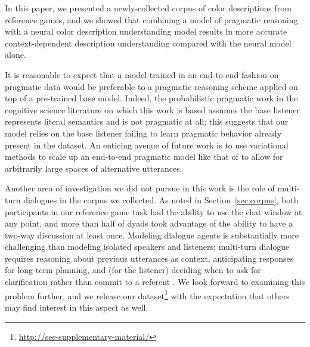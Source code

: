 \documentclass[11pt,letterpaper]{article}
\renewcommand{\|}{\mid}
\newcommand{\secref}[1]{Section~\ref{#1}}
\begin{document}
In this paper, we presented a newly-collected corpus of color descriptions from
reference games, and we showed that combining a model of pragmatic reasoning
with a neural color description understanding model results in more accurate
context-dependent description understanding compared with the neural model alone.

It is reasonable to expect that a model trained in an end-to-end fashion on
pragmatic data would be preferable to a pragmatic reasoning scheme applied on
top of a pre-trained base model.
Indeed, the probabilistic pragmatic work in the cognitive science literature
on which this work is based assumes the base listener represents literal semantics
and is not pragmatic at all; this suggests that our model relies on the base
listener failing to learn pragmatic behavior already present in the dataset.
An enticing avenue of future work is to use variational methods to scale
up an end-to-end pragmatic model like that of  to
allow for arbitrarily large spaces of alternative utterances.

Another area of investigation we did not pursue in this work is the role of
multi-turn dialogues in the corpus we collected. As noted in \secref{sec:corpus},
both participants in our reference game task had the ability to use the chat window
at any point, and more than half of dyads took advantage of the ability
to have a two-way discussion at least once. Modeling dialogue agents is substantially
more challenging than modeling isolated speakers and listeners; multi-turn dialogue
requires reasoning about previous utterances as context, anticipating
responses for long-term planning, and (for the listener) deciding when
to ask for clarification rather than commit to a referent
\cite{Lewis79_Scorekeeping,BrownYule83_Discourse,Clark96,Roberts96_InformationStructureDiscourse}.
We look forward to examining this problem further, and we release our
dataset\footnote{\label{foot:release}\url{http://see-supplementary-material/}}
with the expectation that others may find interest in this aspect as well.
\end{document}
